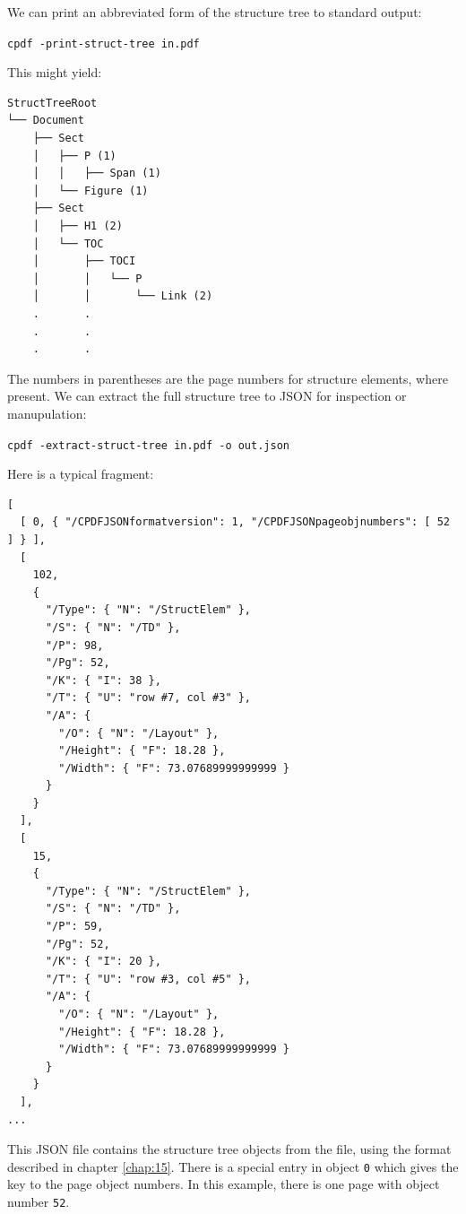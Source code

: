 \documentclass{book}
\newcommand{\smallgap}{\bigskip}
\begin{document}
We can print an abbreviated form of the structure tree to standard output:

  \begin{framed}
    \noindent\small\verb!cpdf -print-struct-tree in.pdf!
  \end{framed}

\noindent This might yield:

\smallgap

\begin{minipage}{\linewidth}
\begin{framed}
\begin{verbatim}
StructTreeRoot
└── Document
    ├── Sect
    │   ├── P (1)
    │   │   ├── Span (1)
    │   └── Figure (1)
    ├── Sect
    │   ├── H1 (2)
    │   └── TOC
    │       ├── TOCI
    │       │   └── P
    │       │       └── Link (2)
    .       .
    .       .
    .       .
\end{verbatim}
\end{framed}
\end{minipage}

\smallgap 
\noindent The numbers in parentheses are the page numbers for structure elements, where present. We can extract the full structure tree to JSON for inspection or manupulation:

  \begin{framed}
    \noindent\small\verb!cpdf -extract-struct-tree in.pdf -o out.json!
  \end{framed}

\noindent Here is a typical fragment:

{\small\begin{verbatim}
[
  [ 0, { "/CPDFJSONformatversion": 1, "/CPDFJSONpageobjnumbers": [ 52 ] } ],
  [
    102,
    {
      "/Type": { "N": "/StructElem" },
      "/S": { "N": "/TD" },
      "/P": 98,
      "/Pg": 52,
      "/K": { "I": 38 },
      "/T": { "U": "row #7, col #3" },
      "/A": {
        "/O": { "N": "/Layout" },
        "/Height": { "F": 18.28 },
        "/Width": { "F": 73.07689999999999 }
      }
    }
  ],
  [
    15,
    {
      "/Type": { "N": "/StructElem" },
      "/S": { "N": "/TD" },
      "/P": 59,
      "/Pg": 52,
      "/K": { "I": 20 },
      "/T": { "U": "row #3, col #5" },
      "/A": {
        "/O": { "N": "/Layout" },
        "/Height": { "F": 18.28 },
        "/Width": { "F": 73.07689999999999 }
      }
    }
  ],
...
\end{verbatim}}

\noindent This JSON file contains the structure tree objects from the file, using the format described in chapter \ref{chap:15}. There is a special entry in object \texttt{0} which gives the key to the page object numbers. In this example, there is one page with object number \texttt{52}.
\end{document}
